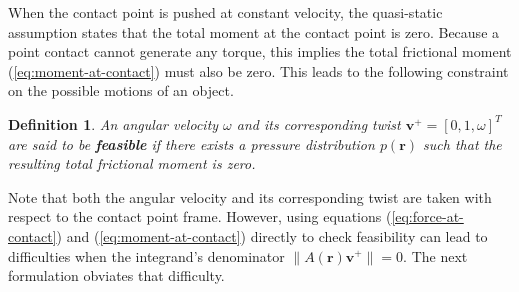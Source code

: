 \documentclass[conference]{IEEEtran}
\newtheorem{definition}{Definition}
\begin{document}
When the contact point is pushed at constant velocity, the
quasi-static assumption states that the total moment at the contact
point is zero. Because a point contact cannot generate any torque,
this implies the total frictional moment (\ref{eq:moment-at-contact})
must also be zero. This leads to the following constraint on the
possible motions of an object.
\begin{definition}
  An angular velocity $\omega$ and its corresponding twist
  $\mathbf{v}^+ = [0,1,\omega]^T$ are said to be \textbf{feasible} if
  there exists a pressure distribution $p(\mathbf{r})$ such that the
  resulting total frictional moment is zero.
\end{definition} 
Note that both the angular velocity and its corresponding twist are
taken with respect to the contact point frame. However, using
equations (\ref{eq:force-at-contact}) and (\ref{eq:moment-at-contact})
directly to check feasibility can lead to difficulties when the
integrand's denominator $\lVert A(\mathbf{r})\mathbf{v}^+\rVert =
0$. The next formulation obviates that difficulty.
\end{document}
